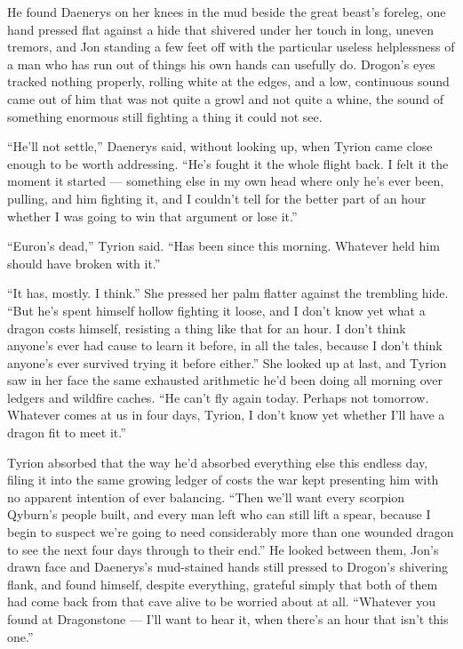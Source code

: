He found Daenerys on her knees in the mud beside the great beast’s foreleg, one hand pressed flat against a hide that shivered under her touch in long, uneven tremors, and Jon standing a few feet off with the particular useless helplessness of a man who has run out of things his own hands can usefully do. Drogon’s eyes tracked nothing properly, rolling white at the edges, and a low, continuous sound came out of him that was not quite a growl and not quite a whine, the sound of something enormous still fighting a thing it could not see.

“He’ll not settle,” Daenerys said, without looking up, when Tyrion came close enough to be worth addressing. “He’s fought it the whole flight back. I felt it the moment it started — something else in my own head where only he’s ever been, pulling, and him fighting it, and I couldn’t tell for the better part of an hour whether I was going to win that argument or lose it.”

“Euron’s dead,” Tyrion said. “Has been since this morning. Whatever held him should have broken with it.”

“It has, mostly. I think.” She pressed her palm flatter against the trembling hide. “But he’s spent himself hollow fighting it loose, and I don’t know yet what a dragon costs himself, resisting a thing like that for an hour. I don’t think anyone’s ever had cause to learn it before, in all the tales, because I don’t think anyone’s ever survived trying it before either.” She looked up at last, and Tyrion saw in her face the same exhausted arithmetic he’d been doing all morning over ledgers and wildfire caches. “He can’t fly again today. Perhaps not tomorrow. Whatever comes at us in four days, Tyrion, I don’t know yet whether I’ll have a dragon fit to meet it.”

Tyrion absorbed that the way he’d absorbed everything else this endless day, filing it into the same growing ledger of costs the war kept presenting him with no apparent intention of ever balancing. “Then we’ll want every scorpion Qyburn’s people built, and every man left who can still lift a spear, because I begin to suspect we’re going to need considerably more than one wounded dragon to see the next four days through to their end.” He looked between them, Jon’s drawn face and Daenerys’s mud-stained hands still pressed to Drogon’s shivering flank, and found himself, despite everything, grateful simply that both of them had come back from that cave alive to be worried about at all. “Whatever you found at Dragonstone — I’ll want to hear it, when there’s an hour that isn’t this one.”

